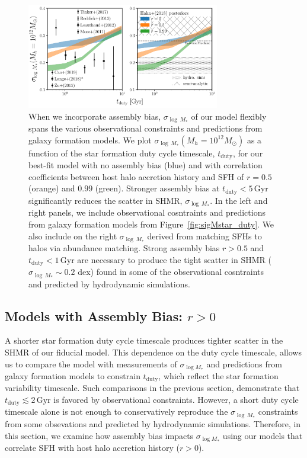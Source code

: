 \documentclass[12pt, letterpaper, preprint, tighten]{aastex62}
\newcommand{\edt}[1]{{\color{dred}{\bf} #1}}
\begin{document}
\begin{figure}
\begin{center}
\includegraphics[width=0.75\textwidth]{figs/SHMRscatter_tduty_abias2.pdf}
    \caption{When we incorporate assembly bias, $\sigma_{\log\,M_*}$ of our 
    model flexibly spans the various observational constraints and predictions 
    from galaxy formation models. We plot $\sigma_{\log\,M_*}(M_h=10^{12}M_\odot)$ 
    as a function of the star formation duty cycle timescale, $t_\mathrm{duty}$,
    for our best-fit model with no assembly bias (blue) and with correlation 
    coefficients between host halo accretion history and SFH of $r = 0.5$ 
    (orange) and $0.99$ (green).  Stronger assembly bias at 
    $t_\mathrm{duty} < 5\,\mathrm{Gyr}$ significantly reduces the scatter 
    in SHMR, $\sigma_{\log\,M_*}$. In the left and right panels, we include observational 
    cosntraints and predictions from galaxy formation models from 
    Figure~\ref{fig:sigMstar_duty}. We also include on the right $\sigma_{\log\,M_*}$ 
    derived from matching \cite{abramson2016} SFHs to halos via abundance matching.
    Strong assembly bias $r > 0.5$ and $t_\mathrm{duty} < 1\,\mathrm{Gyr}$ are necessary  
    to produce the tight scatter in SHMR ($\sigma_{\log\,M_*}\sim 0.2$ dex) found in 
    some of the observational cosntraints and predicted by hydrodynamic simulations. 
    }
\label{fig:sigMstar_duty_abias}
\end{center}
\end{figure}

\subsection{\edt{Models with Assembly Bias: $r > 0$}}
A shorter star formation duty cycle timescale produces tighter scatter in the 
SHMR of our \edt{fiducial} model. This dependence on the duty cycle timescale, 
allows us to compare the model with measurements of $\sigma_{\log M_*}$ and 
predictions from galaxy formation models to constrain $t_\mathrm{duty}$, which 
reflect the star formation variability timescale. Such comparisons in the previous 
section, demonstrate that $t_\mathrm{duty} \lesssim 2\,\mathrm{Gyr}$ is 
favored by observational constraints. However, a short duty cycle 
timescale alone is not enough to conservatively reproduce the $\sigma_{\log\,M_*}$ 
\edt{constraints from some obsevations and predicted by hydrodynamic simulations. 
Therefore, in this section, we examine how assembly bias impacts $\sigma_{\log M_*}$ 
using our models that correlate SFH with host halo accretion history ($r > 0$).}
\end{document}
